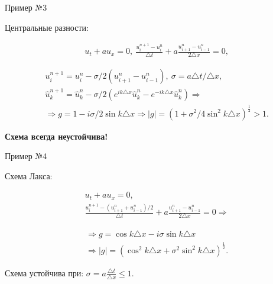 \documentclass[10pt,xcolor=pst,aspectratio=169]{beamer}
\begin{document}
\begin{frame}{Пример №3}

	\transdissolve[duration=0.1]
	\justifying
	\large

	Центральные разности:

	\[
		\begin{split}
			&u_{t} + a u_{x} = 0 , \: \frac{u^{n + 1}_{i} - u^{n}_{i}}{\triangle t} + a \frac{u^{n}_{i + 1} - u^{n}_{i - 1}}{2 \triangle x} = 0,
		\end{split}
	\]

	\pause

	\[
		\begin{split}
			&u^{n + 1}_{i} = u^{n}_{i} - \sigma / 2 \left( u^{n}_{i + 1} - u^{n}_{i - 1} \right), \: \sigma = a \triangle t / \triangle x, \\
			&\hat{u}^{n + 1}_{k} = \hat{u}^{n}_{k} - \sigma / 2 \left( e^{i k \triangle x} \hat{u}^{n}_{k} - e^{- i k \triangle x} \hat{u}^{n}_{k} \right) \Rightarrow \\
			& \Rightarrow g = 1 - i \sigma / 2 \sin k \triangle x \Rightarrow |g| = \left( 1 + \sigma^{2} / 4 \sin^{2} k \triangle x \right)^{\frac{1}{2}} > 1 .
		\end{split}
	\]

    \textbf{Схема всегда неустойчива!}\\

\end{frame}

\begin{frame}{Пример №4}

	\transdissolve[duration=0.1]
	\justifying
	\large

	Схема Лакса:

	\[
		\begin{split}
			&u_{t} + a u_{x} = 0 , \\
			&\frac{u^{n + 1}_{i} - (u^{n}_{i+1} + u^{n}_{i-1})/2}{\triangle t} + a \frac{u^{n}_{i + 1} - u^{n}_{i - 1}}{2 \triangle x} = 0 \Rightarrow
		\end{split}
	\]

	\pause

	\[
		\begin{split}
			& \Rightarrow g = \cos k \triangle x - i \sigma \sin k \triangle x \\
			& \Rightarrow |g| = \left( \cos^{2} k \triangle x + \sigma^{2} \sin^{2} k \triangle x \right)^{\frac{1}{2}} .
		\end{split}
	\]

    Схема устойчива при: $\sigma = a \frac{\triangle t}{\triangle x} \leq 1$.\\

\end{frame}
\end{document}
